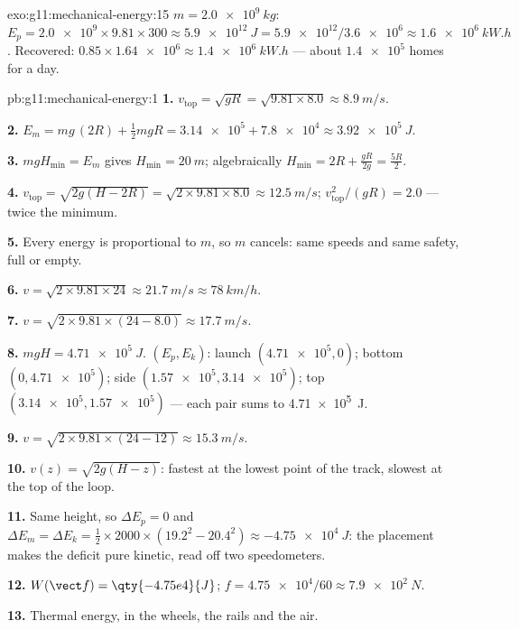 \begin{solution}{exo:g11:mechanical-energy:15}
$m = \qty{2.0e9}{kg}$:
$E_p = \num{2.0e9} \times 9.81 \times 300 \approx \qty{5.9e12}{J}
= \num{5.9e12}/\num{3.6e6} \approx \qty{1.6e6}{kW.h}$. Recovered:
$0.85 \times \num{1.64e6} \approx \qty{1.4e6}{kW.h}$ --- about
$\num{1.4e5}$ homes for a day.
\end{solution}

\begin{solution}{pb:g11:mechanical-energy:1}
\textbf{1.} $v_{\text{top}} = \sqrt{gR} = \sqrt{9.81 \times 8.0}
\approx \qty{8.9}{m/s}$.

\textbf{2.} $E_m = mg\,(2R) + \tfrac12 m gR = \num{3.14e5} +
\num{7.8e4} \approx \qty{3.92e5}{J}$.

\textbf{3.} $mgH_{\min} = E_m$ gives $H_{\min} = \qty{20}{m}$;
algebraically $H_{\min} = 2R + \frac{gR}{2g} = \frac{5R}{2}$.

\textbf{4.} $v_{\text{top}} = \sqrt{2g(H - 2R)} =
\sqrt{2 \times 9.81 \times 8.0} \approx \qty{12.5}{m/s}$;
$v_{\text{top}}^2/(gR) = 2.0$ --- twice the minimum.

\textbf{5.} Every energy is proportional to $m$, so $m$ cancels: same
speeds and same safety, full or empty.

\textbf{6.} $v = \sqrt{2 \times 9.81 \times 24} \approx \qty{21.7}{m/s}
\approx \qty{78}{km/h}$.

\textbf{7.} $v = \sqrt{2 \times 9.81 \times (24 - 8.0)} \approx
\qty{17.7}{m/s}$.

\textbf{8.} $mgH = \qty{4.71e5}{J}$. $(E_p, E_k)$: launch
$(\num{4.71e5}, 0)$; bottom $(0, \num{4.71e5})$; side
$(\num{1.57e5}, \num{3.14e5})$; top $(\num{3.14e5}, \num{1.57e5})$ ---
each pair sums to \qty{4.71e5}{J}.

\textbf{9.} $v = \sqrt{2 \times 9.81 \times (24 - 12)} \approx
\qty{15.3}{m/s}$.

\textbf{10.} $v(z) = \sqrt{2g(H - z)}$: fastest at the lowest point of
the track, slowest at the top of the loop.

\textbf{11.} Same height, so $\Delta E_p = 0$ and
$\Delta E_m = \Delta E_k = \tfrac12 \times 2000 \times (19.2^2 -
20.4^2) \approx \qty{-4.75e4}{J}$: the placement makes the deficit pure
kinetic, read off two speedometers.

\textbf{12.} $W(\vect f) = \qty{-4.75e4}{J}$;
$f = \num{4.75e4}/60 \approx \qty{7.9e2}{N}$.

\textbf{13.} Thermal energy, in the wheels, the rails and the air.


\end{solution}
